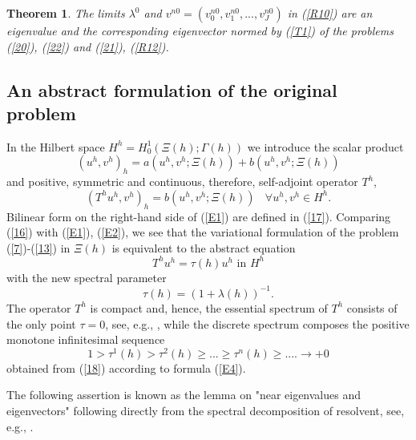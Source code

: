 \documentclass[11pt]{article}%
\newtheorem{theorem}{Theorem}
\numberwithin{equation}{section}
\begin{document}
\begin{theorem}
\label{th2T}The limits $\lambda^{0}$ and $v^{n0}=(v_{0}^{n0},v_{1}%
^{n0},...,v_{J}^{n0})$ in (\ref{R10}) are an eigenvalue and the corresponding
eigenvector normed by (\ref{T1}) of the problems (\ref{20}), (\ref{22}) and
(\ref{21}), (\ref{R12}).
\end{theorem}

\subsection{An abstract formulation of the original problem\label{sect4.3}}

In the Hilbert space $H^{h}=H_{0}^{1}(\Xi(h);\Gamma(h))$ we introduce the
scalar product%
\begin{equation}
(u^{h},v^{h})_{h}=a(u^{h},v^{h};\Xi(h))+b(u^{h},v^{h};\Xi(h)) \label{E1}%
\end{equation}
and positive, symmetric and continuous, therefore, self-adjoint operator
$T^{h}$,%
\begin{equation}
(T^{h}u^{h},v^{h})_{h}=b(u^{h},v^{h};\Xi(h))\ \ \ \ \forall u^{h},v^{h}\in
H^{h}. \label{E2}%
\end{equation}
Bilinear form on the right-hand side of (\ref{E1}) are defined in (\ref{17}).
Comparing (\ref{16}) with (\ref{E1}), (\ref{E2}), we see that the variational
formulation of the problem (\ref{7})-(\ref{13}) in $\Xi(h)$ is equivalent to
the abstract equation%
\begin{equation}
T^{h}u^{h}=\tau(h)u^{h}\text{ \ in }H^{h} \label{E3}%
\end{equation}
with the new spectral parameter%
\begin{equation}
\tau(h)=(1+\lambda(h))^{-1}. \label{E4}%
\end{equation}
The operator $T^{h}$ is compact and, hence, the essential spectrum of $T^{h}$
consists of the only point $\tau=0$, see, e.g., \cite[Thm. 10.1.5]{BiSo},
while the discrete spectrum composes the positive monotone infinitesimal
sequence%
\begin{equation}
1>\tau^{1}(h)>\tau^{2}(h)\geq...\geq\tau^{n}(h)\geq....\rightarrow+0
\label{E5}%
\end{equation}
obtained from (\ref{18}) according to formula (\ref{E4}).

The following assertion is known as the lemma on "near eigenvalues and
eigenvectors" \cite{ViLu} following directly from the spectral decomposition
of resolvent, see, e.g., \cite[Ch. 6]{BiSo}.
\end{document}
